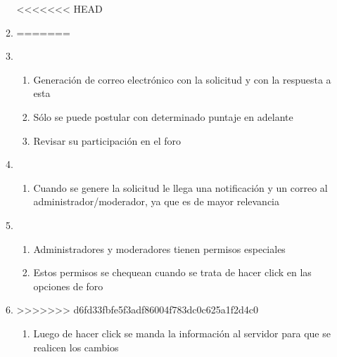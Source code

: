 \documentclass[12pt, letterpaper, notitlepage]{article}
\begin{document}
\begin{enumerate}
\begin{enumerate}
<<<<<<< HEAD

		

		
	
	\item {}
=======
		\item {}
		\begin{enumerate}
			\item Generación de correo electrónico con la solicitud y con la respuesta a esta
			\item Sólo se puede postular con determinado puntaje en adelante
			\item Revisar su participación en el foro
		\end{enumerate}
		
		\item {}
		\begin{enumerate}
			\item Cuando se genere la solicitud le llega una notificación y un correo al administrador/moderador, ya que es de mayor relevancia
		\end{enumerate}
		
		\item {}
		\begin{enumerate}
			\item Administradores y moderadores tienen permisos especiales
			\item Estos permisos se chequean cuando se trata de hacer click en las opciones de foro
		\end{enumerate}
		
		\item {}
>>>>>>> d6fd33fbfe5f3adf86004f783dc0c625a1f2d4c0
		\begin{enumerate}
			\item Luego de hacer click se manda la información al servidor para que se realicen los cambios
		\end{enumerate}
		

\end{enumerate}
\end{enumerate}
\end{document}

